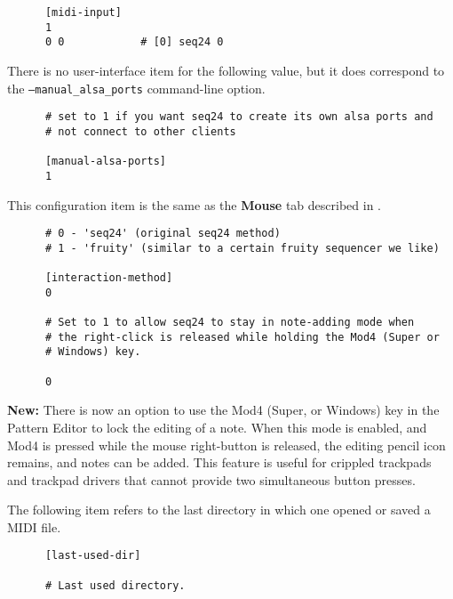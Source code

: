    \begin{verbatim}
      [midi-input]
      1
      0 0            # [0] seq24 0
   \end{verbatim}

   There is no user-interface item for the following value, but
   it does correspond to the \texttt{--manual\_alsa\_ports} command-line
   option.

   \begin{verbatim}
      # set to 1 if you want seq24 to create its own alsa ports and
      # not connect to other clients

      [manual-alsa-ports]
      1
   \end{verbatim}

   This configuration item is the same as the 
   \textbf{Mouse} tab described in
   .

   \begin{verbatim}
      # 0 - 'seq24' (original seq24 method)
      # 1 - 'fruity' (similar to a certain fruity sequencer we like)

      [interaction-method]
      0

      # Set to 1 to allow seq24 to stay in note-adding mode when
      # the right-click is released while holding the Mod4 (Super or
      # Windows) key.

      0
   \end{verbatim}

   \textbf{New:}
   There is now an option to use the Mod4 (Super, or Windows) key in the
   Pattern Editor to lock the editing of a note.  When this mode is enabled,
   and Mod4 is pressed while the mouse right-button is released, the
   editing pencil icon remains, and notes can be added.  This feature is
   useful for crippled trackpads and trackpad drivers that cannot provide
   two simultaneous button presses.

   The following item refers to the last directory in which one opened or
   saved a MIDI file.

   \begin{verbatim}
      [last-used-dir]

      # Last used directory.
   \end{verbatim}

